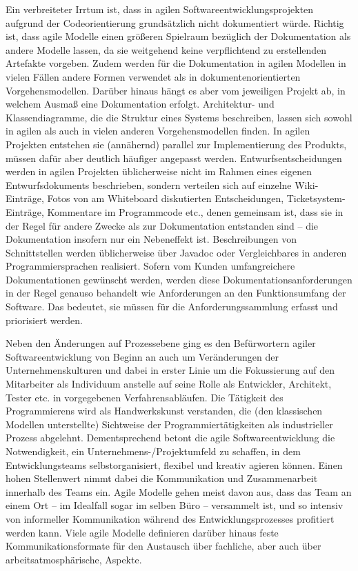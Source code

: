 Ein verbreiteter Irrtum ist, dass in agilen Softwareentwicklungsprojekten aufgrund der Codeorientierung grundsätzlich nicht dokumentiert würde. Richtig ist, dass agile Modelle einen größeren Spielraum bezüglich der Dokumentation als andere Modelle lassen, da sie weitgehend keine verpflichtend zu erstellenden Artefakte vorgeben. Zudem werden für die Dokumentation in agilen Modellen in vielen Fällen andere Formen verwendet als in dokumentenorientierten Vorgehensmodellen. Darüber hinaus hängt es aber vom jeweiligen Projekt ab, in welchem Ausmaß eine Dokumentation erfolgt. Architektur- und Klassendiagramme, die die Struktur eines Systems beschreiben, lassen sich sowohl in agilen als auch in vielen anderen Vorgehensmodellen finden. In agilen Projekten entstehen sie (annähernd) parallel zur Implementierung des Produkts, müssen dafür aber deutlich häufiger angepasst werden. Entwurfsentscheidungen werden in agilen Projekten üblicherweise nicht im Rahmen eines eigenen Entwurfsdokuments beschrieben, sondern verteilen sich auf einzelne Wiki-Einträge, Fotos von am Whiteboard diskutierten Entscheidungen, Ticketsystem-Einträge, Kommentare im Programmcode etc., denen gemeinsam ist, dass sie in der Regel für andere Zwecke als zur Dokumentation entstanden sind – die Dokumentation insofern nur ein Nebeneffekt ist. Beschreibungen von Schnittstellen werden üblicherweise über Javadoc oder Vergleichbares in anderen Programmiersprachen realisiert. Sofern vom Kunden umfangreichere Dokumentationen gewünscht werden, werden diese Dokumentationsanforderungen in der Regel genauso behandelt wie Anforderungen an den Funktionsumfang der Software. Das bedeutet, sie müssen für die Anforderungssammlung erfasst und priorisiert werden.

\vspace{1mm} %

Neben  den Änderungen auf Prozessebene ging es den Befürwortern agiler Softwareentwicklung von Beginn an auch um Veränderungen der Unternehmenskulturen und dabei in erster Linie um die Fokussierung auf den Mitarbeiter als Individuum anstelle auf seine Rolle als Entwickler, Architekt, Tester etc. in vorgegebenen Verfahrensabläufen. Die Tätigkeit des Programmierens wird als Handwerkskunst verstanden, die (den klassischen Modellen unterstellte) Sichtweise der Programmiertätigkeiten als industrieller Prozess abgelehnt. Dementsprechend betont die agile Softwareentwicklung die Notwendigkeit, ein Unternehmens-/Projektumfeld zu schaffen, in dem Entwicklungsteams selbstorganisiert, flexibel und kreativ agieren können. Einen hohen Stellenwert nimmt dabei die Kommunikation und Zusammenarbeit innerhalb des Teams ein. Agile Modelle gehen meist davon aus, dass das Team an einem Ort – im Idealfall sogar im selben Büro – versammelt ist, und so intensiv von informeller Kommunikation während des Entwicklungsprozesses profitiert werden kann. Viele agile Modelle definieren darüber hinaus feste Kommunikationsformate für den Austausch über fachliche, aber auch über arbeitsatmosphärische, Aspekte. 

